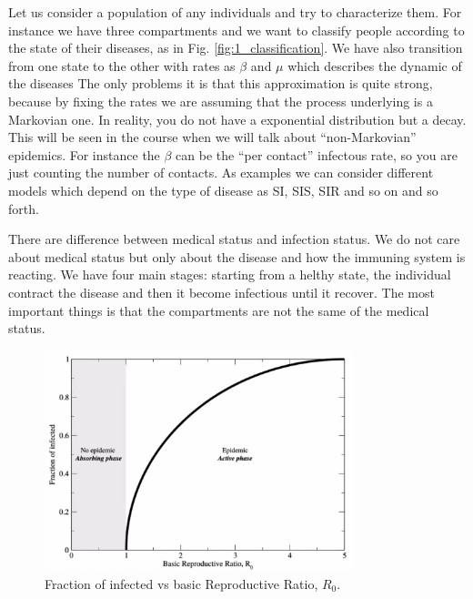 \documentclass[../main/main.tex]{subfiles}
\begin{document}
Let us consider a population of any individuals and try to characterize them. For instance we have three compartments and we want to classify people according to the state of their diseases, as in Fig. \ref{fig:1_classification}. We have also transition from one state to the other with rates as \( \beta  \) and \( \mu  \) which describes the dynamic of the diseases
The only problems it is that this approximation is quite strong, because by fixing the rates we are assuming that the process underlying is a Markovian one. In reality, you do not have a exponential distribution but a decay. This will be seen in the course when we will talk about “non-Markovian” epidemics. For instance the \( \beta  \) can be the “per contact” infectous rate, so you are just counting the number of contacts.
As examples we can consider different models which depend on the type of disease as SI, SIS, SIR and so on and so forth.

There are difference between medical status and infection status. We do not care about medical status but only about the disease and how the immuning system is reacting. We have four main stages: starting from a helthy state, the individual contract the disease and then it become infectious until it recover. The most important things is that the compartments are not the same of the medical status.


\begin{figure}[t!]
\centering
\includegraphics[width=0.8\textwidth]{../lessons/image/02/2_R_0.png}
\caption{\label{fig:2_R_0.png} Fraction of infected vs basic Reproductive Ratio, \( R_0 \).}
\end{figure}
\end{document}
